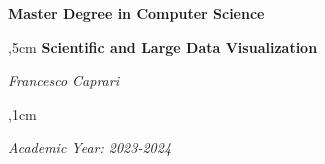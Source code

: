 \begin{titlepage}
    
    \centering

    \vskip 5cm
        \begin{Large}
            {
            \bf Master Degree in Computer Science
            }
            \\
        \end{Large}
    
    ,5cm
    {\Huge\bfseries Scientific and Large Data Visualization}
    \vskip 10cm
        \begin{Large}
        \vskip 0.3cm
        \textit{Francesco Caprari}
        \end{Large}
    ,1cm
    
    \begin{Large}
        \textit{Academic Year: 2023-2024}
    \end{Large}
    
\end{titlepage}